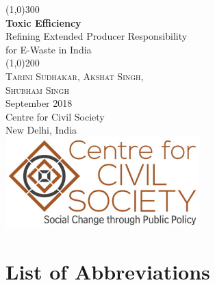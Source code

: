 \documentclass[a4paper, 12pt]{article}
\begin{document}
                    

\begin{titlepage}
\begin{center}
\line(1,0){300}\\
[0.25in]
\huge{\bfseries\textcolor{CCSbrown} {Toxic Efficiency}} \\
[0.5cm]
\large{Refining Extended Producer Responsibility \\ for E-Waste in India} \\
    	
\line(1,0){200}\\
[1in]
\textsc{\huge Tarini Sudhakar, Akshat Singh, \\ Shubham Singh} \\
[1.5cm]
{\Large September 2018} \\
[2.0cm]

{\LARGE Centre for Civil Society} \\
[0.1mm]
{\Large New Delhi, India} \\
[2.0cm]
\includegraphics[width = 75mm]{CCSlogo.jpg}
      
\end{center}
\end{titlepage}

                    \tableofcontents
                    
\newpage
{}

\section*{List of Abbreviations}
        
\end{document}
